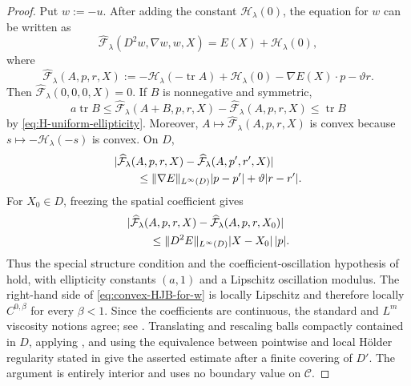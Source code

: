 \documentclass[11pt]{article}
\def\Fc{{\mathcal F}}
\newcommand{\tr}{\operatorname{tr}}
\newcommand{\Coll}{\mathscr C}
\theoremstyle{definition}
\theoremstyle{remark}
\numberwithin{equation}{section}
\begin{document}
\begin{proof}
Put $w:=-u$.  After adding the constant $\mathscr H_\lambda(0)$, the equation for $w$ can be
written as
\begin{equation}\label{eq:convex-HJB-for-w}
 \widehat\Fc_\lambda(D^2w,\nabla w,w,X)
 =E(X)+\mathscr H_\lambda(0),
\end{equation}
where
\begin{equation}\label{eq:normalized-HJB-operator-main}
 \widehat\Fc_\lambda(A,p,r,X)
 :=-\mathscr H_\lambda(-\tr A)+\mathscr H_\lambda(0)
 -\nabla E(X)\cdot p-\vartheta r.
\end{equation}
Then $\widehat\Fc_\lambda(0,0,0,X)=0$.  If $B$ is nonnegative and symmetric,
\begin{equation}\label{eq:proper-uniform-ellipticity-HJB}
 a\tr B
 \le
 \widehat\Fc_\lambda(A+B,p,r,X)-\widehat\Fc_\lambda(A,p,r,X)
 \le\tr B
\end{equation}
by \eqref{eq:H-uniform-ellipticity}.  Moreover,
$A\mapsto\widehat\Fc_\lambda(A,p,r,X)$ is convex because
$s\mapsto-\mathscr H_\lambda(-s)$ is convex.  On $D$,
\begin{align}
 &|\widehat\Fc_\lambda(A,p,r,X)-
 \widehat\Fc_\lambda(A,p',r',X)|\notag\\
 &\qquad\le \|\nabla E\|_{L^\infty(D)}|p-p'|
 +\vartheta|r-r'|.
 \label{eq:lower-order-HJB-structure}
\end{align}
For $X_0\in D$, freezing the spatial coefficient gives
\begin{align}
 &|\widehat\Fc_\lambda(A,p,r,X)-
 \widehat\Fc_\lambda(A,p,r,X_0)|\notag\\
 &\qquad\le \|D^2E\|_{L^\infty(D)}|X-X_0|\,|p|.
 \label{eq:coefficient-oscillation-HJB-main}
\end{align}
Thus the special structure condition and the coefficient-oscillation hypothesis of
\cite[Theorem~5.1]{LianWangZhang2026} hold, with ellipticity constants $(a,1)$ and a Lipschitz
oscillation modulus.  The right-hand side of \eqref{eq:convex-HJB-for-w} is locally Lipschitz and
therefore locally $C^{0,\beta}$ for every $\beta<1$.  Since the coefficients are continuous, the
standard and $L^m$ viscosity notions agree; see
\cite[Remark~2.9]{LianWangZhang2026}.  Translating and rescaling balls compactly contained in $D$,
applying \cite[Theorem~5.1]{LianWangZhang2026}, and using the equivalence between pointwise and
local H\"older regularity stated in \cite[Remark~2.3]{LianWangZhang2026} give the asserted estimate
after a finite covering of $D'$.  The argument is entirely interior and uses no boundary value on
$\Coll$.
\end{proof}
\end{document}
